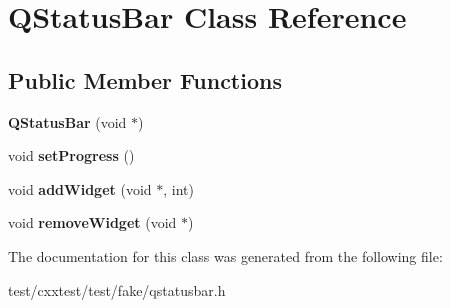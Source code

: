 \hypertarget{classQStatusBar}{\section{Q\-Status\-Bar Class Reference}
\label{classQStatusBar}
}
\subsection*{Public Member Functions}
\begin{DoxyCompactItemize}
\item 
\hypertarget{classQStatusBar_a7b13fdd122c71710fdd2036fec47bdaf}{{\bfseries Q\-Status\-Bar} (void $\ast$)}\label{classQStatusBar_a7b13fdd122c71710fdd2036fec47bdaf}

\item 
\hypertarget{classQStatusBar_aa2821f13cfdc6735974d27933895d4f7}{void {\bfseries set\-Progress} ()}\label{classQStatusBar_aa2821f13cfdc6735974d27933895d4f7}

\item 
\hypertarget{classQStatusBar_a812277b07763ac0d4f10ff82da5931f2}{void {\bfseries add\-Widget} (void $\ast$, int)}\label{classQStatusBar_a812277b07763ac0d4f10ff82da5931f2}

\item 
\hypertarget{classQStatusBar_ad86e2097fff456cf1630cdc12b7bbc94}{void {\bfseries remove\-Widget} (void $\ast$)}\label{classQStatusBar_ad86e2097fff456cf1630cdc12b7bbc94}

\end{DoxyCompactItemize}


The documentation for this class was generated from the following file\-:\begin{DoxyCompactItemize}
\item 
test/cxxtest/test/fake/qstatusbar.\-h\end{DoxyCompactItemize}
